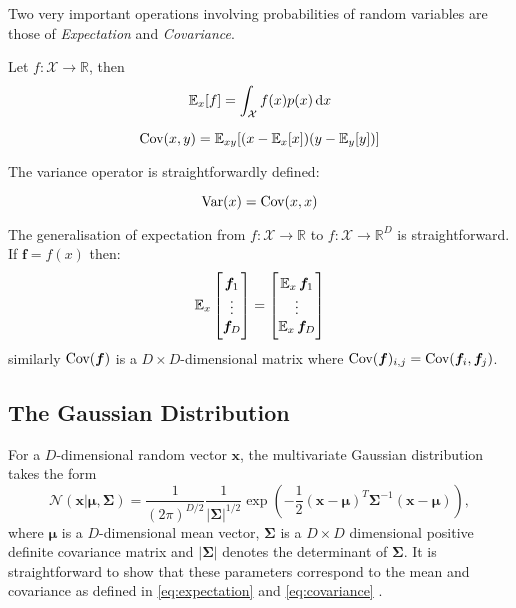 Two very important operations involving probabilities of random variables are
those of \textit{Expectation} and \textit{Covariance}.
\begin{definition}[Expectation]
  \label{eq:expectation}
  Let $f : \mathcal{X} \to \mathbb{R}$, then
  \begin{equation*}
    \E_x[f] = \int_{\mathcal{X}} f(x) p(x) \dif x
  \end{equation*}
\end{definition}
\begin{definition}[Covariance]
  \label{eq:covariance}
  \begin{equation*}
    \operatorname{\textnormal{Cov}}(x, y) = \operatorname{\mathbb{E}}_{xy}[(x - \operatorname{\mathbb{E}}_x[x])(y - \operatorname{\mathbb{E}}_y[y])]
  \end{equation*}
\end{definition}
The variance operator is straightforwardly defined:
\begin{definition}[Variance]
  \label{eq:variance}
  \begin{equation*}
    \operatorname{\textnormal{Var}}(x) = \operatorname{\textnormal{Cov}}(x, x)
  \end{equation*}
\end{definition}

The generalisation of expectation from $f: \mathcal{X} \to \mathbb{R}$ to $f: \mathcal{X} \to
\mathbb{R}^D$ is straightforward. If $\bm{f} =
f(x)$ then:
\begin{equation*}
  \operatorname{\mathbb{E}}_x
  \begin{bmatrix}
    \bm{f}_1 \\
    \vdots \\
    \bm{f}_D \\
  \end{bmatrix} =
  \begin{bmatrix}
    \operatorname{\mathbb{E}}_x \bm{f}_1 \\
    \vdots \\
    \operatorname{\mathbb{E}}_x \bm{f}_D \\
  \end{bmatrix}
\end{equation*}
similarly $\operatorname{\textnormal{Cov}}(\bm{f})$ is a $D \times D$-dimensional matrix where
$\operatorname{\textnormal{Cov}}(\bm{f})_{i,j} = \operatorname{\textnormal{Cov}}(\bm{f}_i,
\bm{f}_j)$\cite{Bishop:2006, Barber:2012:BRM:2207809}.

\subsection{The Gaussian Distribution}
For a $D$-dimensional random vector $\bm{x}$, the multivariate Gaussian
distribution takes the form
\begin{equation}
  \label{eq:Gaussian_dist}
  \mathcal{N}(\bm{x} | \bm{\mu}, \bm{\Sigma}) = \frac{1}{(2\pi)^{D/2}}\frac{1}{|\bm{\Sigma}|^{1/2}}\exp\left( -\frac{1}{2}(\bm{x} - \bm{\mu})^T\bm{\Sigma}^{-1}(\bm{x} - \bm{\mu})\right),
\end{equation}
where $\bm{\mu}$ is a $D$-dimensional mean vector, $\bm{\Sigma}$ is a $D \times
D$ dimensional positive definite covariance matrix and $|\bm{\Sigma}|$ denotes
the determinant of $\bm{\Sigma}$. It is straightforward to show that these
parameters correspond to the mean and covariance as defined in
\ref{eq:expectation} and \ref{eq:covariance} \cite{Barber:2012:BRM:2207809}.

